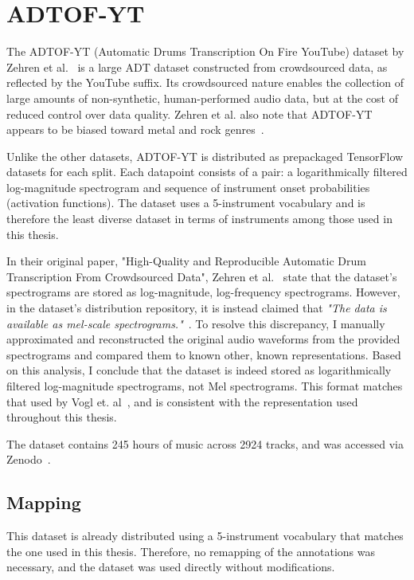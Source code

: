 \section{ADTOF-YT}

The ADTOF-YT (Automatic Drums Transcription On Fire YouTube) dataset by Zehren et al.~\cite{signals4040042} is a large \gls{ADT} dataset constructed from crowdsourced data, as reflected by the YouTube suffix. Its crowdsourced nature enables the collection of large amounts of non-synthetic, human-performed audio data, but at the cost of reduced control over data quality. Zehren et al. also note that ADTOF-YT appears to be biased toward metal and rock genres~\cite{signals4040042}.

Unlike the other datasets, ADTOF-YT is distributed as prepackaged TensorFlow datasets for each split. Each datapoint consists of a pair: a logarithmically filtered log-magnitude spectrogram and sequence of instrument onset probabilities (activation functions). The dataset uses a 5-instrument vocabulary and is therefore the least diverse dataset in terms of instruments among those used in this thesis.

In their original paper, "High-Quality and Reproducible Automatic Drum Transcription From Crowdsourced Data", Zehren et al.~\cite{signals4040042} state that the dataset's spectrograms are stored as log-magnitude, log-frequency spectrograms. However, in the dataset's distribution repository, it is instead claimed that \textit{"The data is available as mel-scale spectrograms."}~\cite{zehren_2023_10084511}. To resolve this discrepancy, I manually approximated and reconstructed the original audio waveforms from the provided spectrograms and compared them to known other, known representations. Based on this analysis, I conclude that the dataset is indeed stored as logarithmically filtered log-magnitude spectrograms, not Mel spectrograms. This format matches that used by Vogl et. al~\cite{Vogl2017DrumTV}, and is consistent with the representation used throughout this thesis.

The dataset contains 245 hours of music across 2924 tracks, and was accessed via Zenodo~\cite{zehren_2023_10084511, signals4040042}.

\subsection{Mapping}

This dataset is already distributed using a 5-instrument vocabulary that matches the one used in this thesis. Therefore, no remapping of the annotations was necessary, and the dataset was used directly without modifications.

